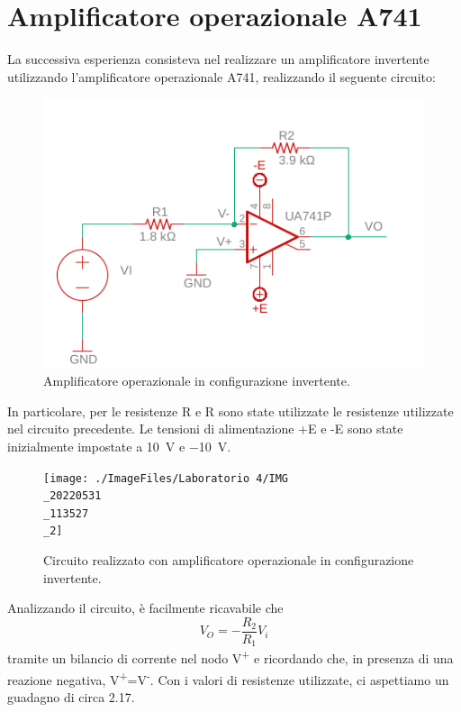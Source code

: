 \section{Amplificatore operazionale \textmu A741}
La successiva esperienza consisteva nel realizzare un amplificatore invertente utilizzando l'amplificatore operazionale \textmu A741, realizzando il seguente circuito:
\begin{figure}[h!]
	\centering
	\includegraphics[width=0.6\linewidth]{./OtherFiles/Laboratorio 4/opam_inv}
	\caption{Amplificatore operazionale in configurazione invertente.}
	\label{fig:opamp_inv}
\end{figure}
In particolare, per le resistenze R e R sono state utilizzate le resistenze utilizzate nel circuito precedente. Le tensioni di alimentazione +E e -E sono state inizialmente impostate a \SI{+10}{\volt} e \SI{-10}{\volt}.

\begin{figure}[h!]
	\centering
	\texttt{[image: ./ImageFiles/Laboratorio 4/IMG\\\_20220531\\\_113527\\\_2]}
	\caption{Circuito realizzato con amplificatore operazionale in configurazione invertente.}
	\label{fig:opamp_inv_circuito}
\end{figure}

Analizzando il circuito, è facilmente ricavabile che 
\begin{equation}
	V_O=-\frac{R_2}{R_1}V_i
\end{equation}
tramite un bilancio di corrente nel nodo V\textsuperscript{+} e ricordando che, in presenza di una reazione negativa, V\textsuperscript{+}=V\textsuperscript{-}. Con i valori di resistenze utilizzate, ci aspettiamo un guadagno di circa 2.17.